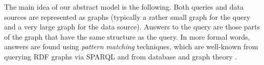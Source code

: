 The main idea of our abstract model is the following.
Both queries and data sources are represented as graphs
(typically a rather small graph for the query and a very large graph for the data source).
Answers to the query are those parts of the graph that have the same structure
as the query. In more formal words, answers are found using \emph{pattern matching} techniques,
which are well-known from querying \gls{RDF} graphs via \gls{SPARQL} \autocite{DellaValle2011}
and from database and graph theory \autocite{Abiteboul1995,Diestel2012}.

%
%


